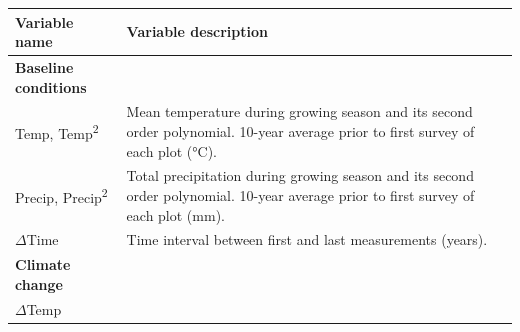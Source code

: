 \documentclass[a4paperpaper,]{article}
\begin{document}
\begin{longtable}[]{@{}ll@{}}
\toprule
\begin{minipage}[b]{0.22\columnwidth}\raggedright
Variable name\strut
\end{minipage} & \begin{minipage}[b]{0.72\columnwidth}\raggedright
Variable description\strut
\end{minipage}\tabularnewline
\midrule
\endhead
\begin{minipage}[t]{0.22\columnwidth}\raggedright
\textbf{Baseline conditions}\strut
\end{minipage} & \begin{minipage}[t]{0.72\columnwidth}\raggedright
\strut
\end{minipage}\tabularnewline
\begin{minipage}[t]{0.22\columnwidth}\raggedright
Temp, Temp\textsuperscript{2}\strut
\end{minipage} & \begin{minipage}[t]{0.72\columnwidth}\raggedright
Mean temperature during growing season and its second order polynomial.
10-year average prior to first survey of each plot (°C).\strut
\end{minipage}\tabularnewline
\begin{minipage}[t]{0.22\columnwidth}\raggedright
Precip, Precip\textsuperscript{2}\strut
\end{minipage} & \begin{minipage}[t]{0.72\columnwidth}\raggedright
Total precipitation during growing season and its second order
polynomial. 10-year average prior to first survey of each plot
(mm).\strut
\end{minipage}\tabularnewline
\begin{minipage}[t]{0.22\columnwidth}\raggedright
\(\Delta\)Time\strut
\end{minipage} & \begin{minipage}[t]{0.72\columnwidth}\raggedright
Time interval between first and last measurements (years).\strut
\end{minipage}\tabularnewline
\begin{minipage}[t]{0.22\columnwidth}\raggedright
\textbf{Climate change}\strut
\end{minipage} & \begin{minipage}[t]{0.72\columnwidth}\raggedright
\strut
\end{minipage}\tabularnewline
\begin{minipage}[t]{0.22\columnwidth}\raggedright
\(\Delta\)Temp\strut

\end{minipage}
\end{longtable}
\end{document}
